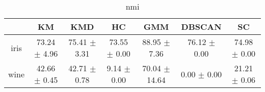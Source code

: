 \begin{table}
\centering
\begin{tabular}{ccccccc}
\toprule
 & KM & KMD & HC & GMM & DBSCAN & SC \\
\midrule
iris & 73.24 $\pm$ 4.96 & 75.41 $\pm$ 3.31 & 73.55 $\pm$ 0.00 & 88.95 $\pm$ 7.36 & 76.12 $\pm$ 0.00 & 74.98 $\pm$ 0.00 \\
wine & 42.66 $\pm$ 0.45 & 42.71 $\pm$ 0.78 & 9.14 $\pm$ 0.00 & 70.04 $\pm$ 14.64 & 0.00 $\pm$ 0.00 & 21.21 $\pm$ 0.06 \\
\bottomrule
\end{tabular}
\caption{nmi}
\label{table:nmi}
\end{table}
